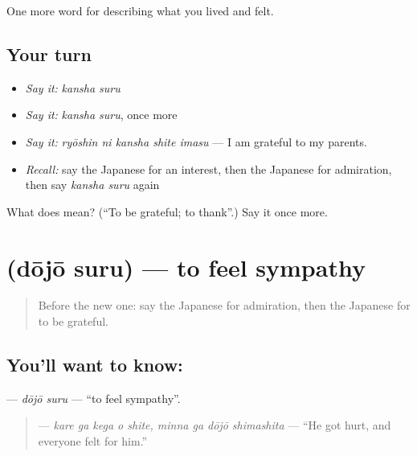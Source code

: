 \begin{grammarlens}[title={What you've built}]
One more word for describing what you lived and felt.
\end{grammarlens}

\subsection*{Your turn}
\begin{itemize}
\raggedright
  \item \emph{Say it:} \emph{kansha suru}
  \item \emph{Say it:} \emph{kansha suru}, once more
  \item \emph{Say it:} \emph{ryōshin ni kansha shite imasu} — I am grateful to my parents.
  \item \emph{Recall:} say the Japanese for an interest, then the Japanese for admiration, then say \emph{kansha suru} again
\end{itemize}

\begin{tcolorbox}[breakable,colback=teal!4,colframe=teal!35!black,title={Before you move on}]
What does  mean? (\textquotedblleft{}To be grateful; to thank\textquotedblright{}.) Say it once more.
\end{tcolorbox}
\section[\texorpdfstring{\ja{どうじょうする} (dōjō suru)}{どうじょうする (dōjō suru)}]{ (dōjō suru) — to feel sympathy}

\label{lesson:JA-C434-doujou-suru}



\begin{quote}
Before the new one: say the Japanese for admiration, then the Japanese for to be grateful.
\end{quote}

\subsection*{You'll want to know: }
\textbf{} — \emph{dōjō suru} — \textquotedblleft{}to feel sympathy\textquotedblright{}.

\begin{quote}
\textbf{   } — \emph{kare ga kega o shite, minna ga dōjō shimashita} — \textquotedblleft{}He got hurt, and everyone felt for him.\textquotedblright{}
\end{quote}

